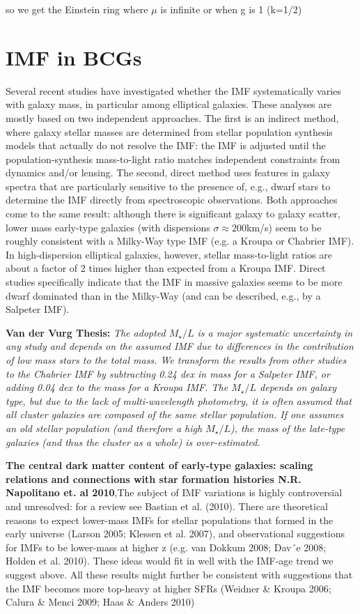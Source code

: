 so we get the Einstein ring where $\mu$ is infinite or when g is 1 (k=1/2)

\section{IMF in BCGs}

Several recent studies have investigated whether the IMF systematically varies with galaxy mass, in particular among elliptical galaxies. These analyses are mostly based on two independent approaches. The first is an indirect method, where galaxy stellar masses are determined from stellar population synthesis models that actually do not resolve the
IMF: the IMF is adjusted until the population-synthesis mass-to-light ratio matches independent constraints from dynamics and/or lensing. The second, direct method uses
features in galaxy spectra that are particularly sensitive to the presence of, e.g., dwarf stars to determine the IMF directly from spectroscopic observations. Both approaches come to the same result: although there is significant galaxy to galaxy scatter, lower mass early-type galaxies (with dispersions $\sigma \approx 200$km/s) seem to be roughly consistent with a Milky-Way type IMF (e.g. a Kroupa or Chabrier IMF). In high-dispersion elliptical galaxies, however, stellar mass-to-light ratios are about a factor of 2 times higher than expected from a Kroupa IMF. Direct studies specifically indicate that the IMF in massive galaxies seems to be more dwarf dominated than in the Milky-Way (and can be described, e.g., by a Salpeter IMF).

\textbf{Van der Vurg Thesis:} \textit{The adopted $M_{\star}/L$ is a major systematic uncertainty in any study and depends on the assumed IMF due to differences in the contribution of low mass stars to the total mass. We transform the results from other studies to the Chabrier IMF by subtracting 0.24 dex in mass for a Salpeter IMF, or adding 0.04 dex to the mass for a Kroupa IMF. The $M_{\star}/L$ depends on galaxy type, but due to the lack of multi-wavelength photometry, it is often assumed that all cluster galaxies are composed of the same stellar population. If one assumes an old stellar population (and therefore a high $M_{\star}/L$), the mass of the late-type galaxies (and thus the cluster as a whole) is over-estimated.}

\textbf{The central dark matter content of early-type galaxies: scaling relations and connections with star formation histories N.R. Napolitano et. al 2010},The subject of IMF variations is highly controversial and unresolved: for a review see Bastian et al. (2010). There are theoretical reasons to expect lower-mass IMFs for stellar populations that formed in the early universe (Larson 2005; Klessen et al. 2007), and observational suggestions for IMFs to be lower-mass at higher z (e.g. van Dokkum 2008; Dav´e 2008; Holden et al. 2010). These ideas would fit in well with the IMF-age trend we suggest above. All these results might further be consistent with suggestions that the IMF becomes more top-heavy at higher SFRs (Weidner \& Kroupa 2006; Calura \& Menci 2009; Haas \& Anders 2010)

